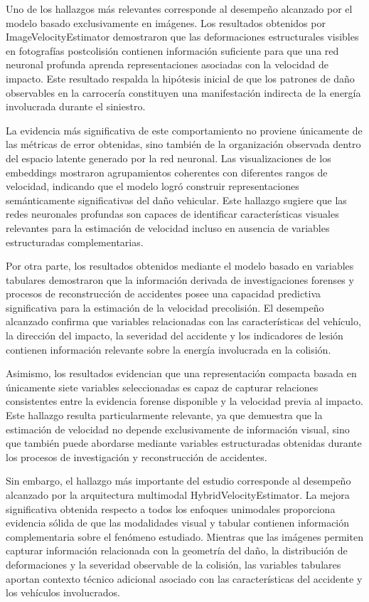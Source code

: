 \documentclass[esp]{SpeedEstimationAI_paper}
\begin{document}
Uno de los hallazgos más relevantes corresponde al desempeño alcanzado por el modelo basado exclusivamente en imágenes. Los resultados obtenidos por ImageVelocityEstimator demostraron que las deformaciones estructurales visibles en fotografías postcolisión contienen información suficiente para que una red neuronal profunda aprenda representaciones asociadas con la velocidad de impacto. Este resultado respalda la hipótesis inicial de que los patrones de daño observables en la carrocería constituyen una manifestación indirecta de la energía involucrada durante el siniestro.

La evidencia más significativa de este comportamiento no proviene únicamente de las métricas de error obtenidas, sino también de la organización observada dentro del espacio latente generado por la red neuronal. Las visualizaciones de los embeddings mostraron agrupamientos coherentes con diferentes rangos de velocidad, indicando que el modelo logró construir representaciones semánticamente significativas del daño vehicular. Este hallazgo sugiere que las redes neuronales profundas son capaces de identificar características visuales relevantes para la estimación de velocidad incluso en ausencia de variables estructuradas complementarias.

Por otra parte, los resultados obtenidos mediante el modelo basado en variables tabulares demostraron que la información derivada de investigaciones forenses y procesos de reconstrucción de accidentes posee una capacidad predictiva significativa para la estimación de la velocidad precolisión. El desempeño alcanzado confirma que variables relacionadas con las características del vehículo, la dirección del impacto, la severidad del accidente y los indicadores de lesión contienen información relevante sobre la energía involucrada en la colisión.

Asimismo, los resultados evidencian que una representación compacta basada en únicamente siete variables seleccionadas es capaz de capturar relaciones consistentes entre la evidencia forense disponible y la velocidad previa al impacto. Este hallazgo resulta particularmente relevante, ya que demuestra que la estimación de velocidad no depende exclusivamente de información visual, sino que también puede abordarse mediante variables estructuradas obtenidas durante los procesos de investigación y reconstrucción de accidentes.

Sin embargo, el hallazgo más importante del estudio corresponde al desempeño alcanzado por la arquitectura multimodal HybridVelocityEstimator. La mejora significativa obtenida respecto a todos los enfoques unimodales proporciona evidencia sólida de que las modalidades visual y tabular contienen información complementaria sobre el fenómeno estudiado. Mientras que las imágenes permiten capturar información relacionada con la geometría del daño, la distribución de deformaciones y la severidad observable de la colisión, las variables tabulares aportan contexto técnico adicional asociado con las características del accidente y los vehículos involucrados.
\end{document}

